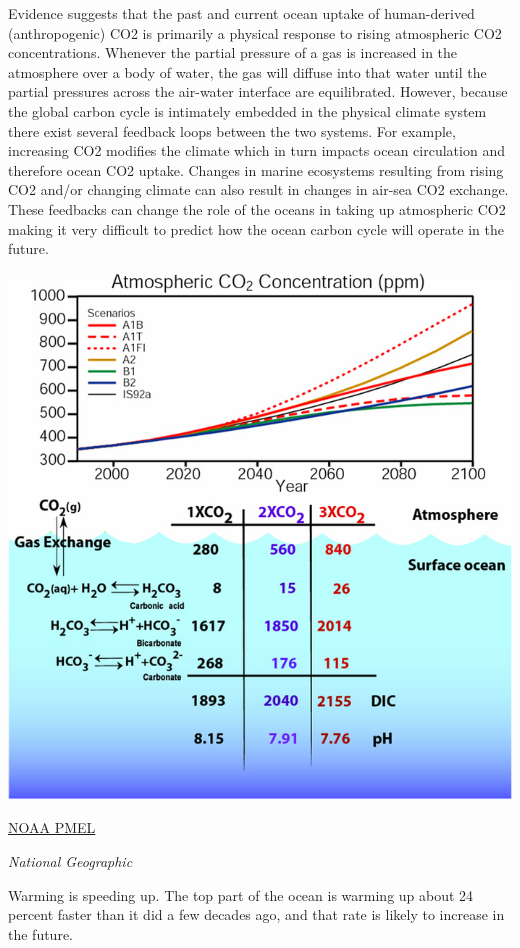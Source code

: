 \documentclass[
]{book}
\begin{document}
Evidence suggests that the past and current ocean uptake of human-derived (anthropogenic) CO2 is primarily a physical response to rising atmospheric CO2 concentrations. Whenever the partial pressure of a gas is increased in the atmosphere over a body of water, the gas will diffuse into that water until the partial pressures across the air-water interface are equilibrated. However, because the global carbon cycle is intimately embedded in the physical climate system there exist several feedback loops between the two systems. For example, increasing CO2 modifies the climate which in turn impacts ocean circulation and therefore ocean CO2 uptake. Changes in marine ecosystems resulting from rising CO2 and/or changing climate can also result in changes in air-sea CO2 exchange. These feedbacks can change the role of the oceans in taking up atmospheric CO2 making it very difficult to predict how the ocean carbon cycle will operate in the future.

\includegraphics{fig/ocean_atmosphere_concentration.jpg}

\href{https://www.pmel.noaa.gov/co2/story/Ocean+Carbon+Uptake}{NOAA PMEL}

\emph{National Geographic}

Warming is speeding up. The top part of the ocean is warming up about 24 percent faster than it did a few decades ago, and that rate is likely to increase in the future.
\end{document}
